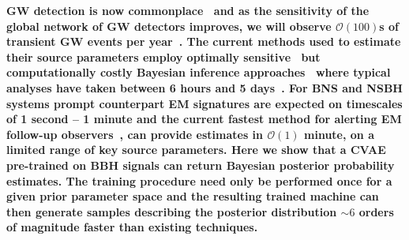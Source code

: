 \documentclass[%
showpacs,
nofootinbib,
 amsmath,amssymb,
 aps,
 twocolumn,
 prl,
 reprint,
floatfix,
]{revtex4-1}
\begin{document}
%
%
%
\textbf{ 
%
%
\ac{GW} detection is now
commonplace~\cite{PhysRevX.6.041015,PhysRevLett.119.161101} and as the
sensitivity of the global network of \ac{GW} detectors improves, we will
observe $\mathcal{O}(100)$s of transient \ac{GW} events per
year~\cite{2018LRR....21....3A}. The current methods used to estimate their
source parameters employ optimally sensitive~\cite{2009CQGra..26o5017S} but
computationally costly Bayesian inference approaches~\cite{1409.7215} where
typical analyses have taken between 6 hours and 5 days~\cite{gracedb_O3}.
%
%
For \ac{BNS} and \ac{NSBH} systems prompt counterpart \ac{EM} signatures are
expected on timescales of 1 second -- 1 minute and the current fastest method
for alerting \ac{EM} follow-up observers~\cite{2016PhRvD..93b4013S}, can
provide estimates in $\mathcal{O}(1)$ minute, on a limited range of key source
parameters. 
%
%
Here we show that a \ac{CVAE}~\cite{1904.06264,1812.04405} pre-trained on
\ac{BBH} signals can return Bayesian posterior probability estimates. The
training procedure need only be performed once for a given prior parameter
space and the resulting trained machine can then generate samples describing
the posterior distribution $\sim 6$ orders of magnitude faster than existing
techniques.}
%
\end{document}
